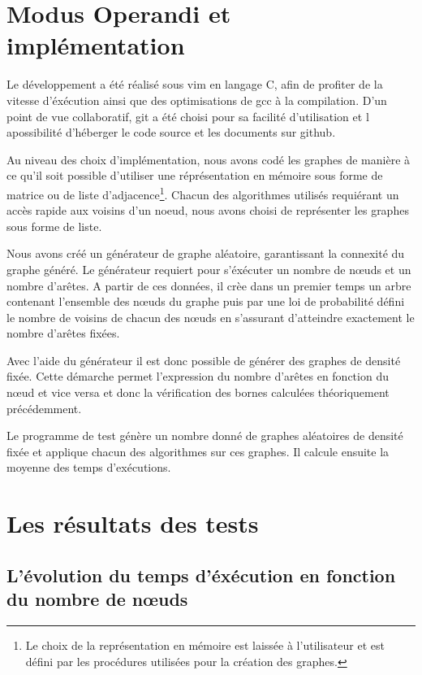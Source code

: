 \section{Modus Operandi et implémentation}

Le développement a été réalisé sous vim en langage C, afin de profiter de la vitesse d'éxécution
ainsi que des optimisations de gcc à la compilation. D'un point de vue collaboratif, git a été
choisi pour sa facilité d'utilisation et l apossibilité d'héberger le code source et les documents
sur github.

Au niveau des choix d'implémentation, nous avons codé les graphes de manière à ce qu'il soit
possible d'utiliser une réprésentation en mémoire sous forme de matrice ou de liste
d'adjacence\footnote{Le choix de la représentation en mémoire est laissée à l'utilisateur et est
défini par les procédures utilisées pour la création des graphes.}. Chacun des algorithmes utilisés
requiérant un accès rapide aux voisins d'un noeud, nous avons choisi de représenter les graphes sous
forme de liste.

Nous avons créé un générateur de graphe aléatoire, garantissant la connexité du graphe généré. Le
générateur requiert pour s'éxécuter un nombre de n\oe uds et un nombre d'arêtes. A partir de ces
données, il crèe dans un premier temps un arbre contenant l'ensemble des n\oe uds du graphe puis par
une loi de probabilité défini le nombre de voisins de chacun des n\oe uds en s'assurant d'atteindre
exactement le nombre d'arêtes fixées.

Avec l'aide du générateur il est donc possible de générer des graphes de densité fixée. Cette
démarche permet l'expression du nombre d'arêtes en fonction du n\oe ud et vice versa et donc la
vérification des bornes calculées théoriquement précédemment.

Le programme de test génère un nombre donné de graphes aléatoires de densité fixée et applique
chacun des algorithmes sur ces graphes. Il calcule ensuite la moyenne des temps d'exécutions.

\section{Les résultats des tests}

\subsection{L'évolution du temps d'éxécution en fonction du nombre de n\oe uds}

